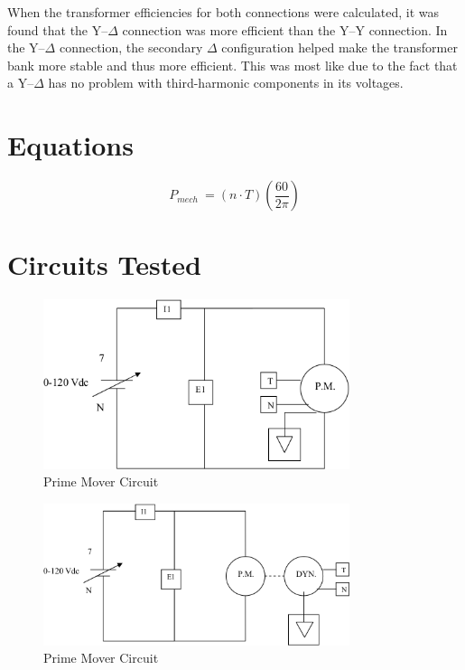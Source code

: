 \documentclass{article}
\begin{document}
When the transformer efficiencies for both connections were calculated, it was
found that the Y--$\Delta$ connection was more efficient than the Y--Y
connection. In the Y--$\Delta$ connection, the secondary $\Delta$ configuration
helped make the transformer bank more stable and thus more efficient. This was
most like due to the fact that a Y--$\Delta$ has no problem with third-harmonic
components in its voltages.

\section*{Equations}

\[P_{mech}\ =  (n \cdot T)\left(\frac{60}{2\pi}\right) \]

\section*{Circuits Tested}

\begin{figure}[H]
  \centering
  \includegraphics[width=0.8\textwidth]{img/circuit_01}
  \caption{Prime Mover Circuit}
  \label{fig:circuit_01}
\end{figure}

\begin{figure}[H]
  \centering
  \includegraphics[width=0.8\textwidth]{img/circuit_02}
  \caption{Prime Mover Circuit}
  \label{fig:circuit_02}
\end{figure}
\end{document}
